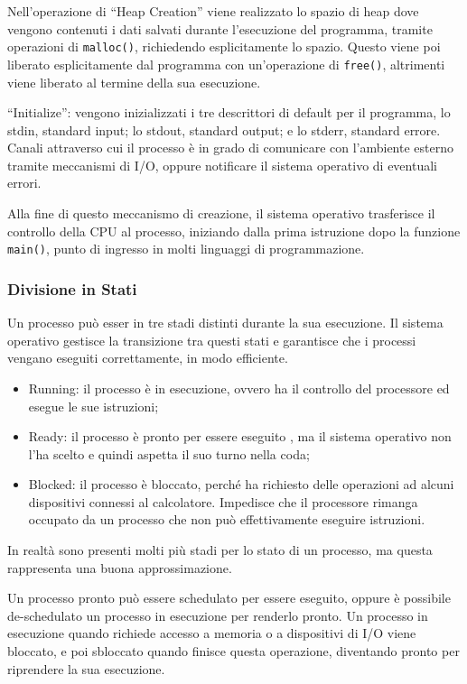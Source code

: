 \documentclass{article}
\numberwithin{equation}{subsection}
\begin{document}
Nell'operazione di ``Heap Creation'' viene realizzato lo spazio di heap dove vengono contenuti i dati salvati durante l'esecuzione del programma, tramite operazioni 
di \verb|malloc()|, richiedendo esplicitamente lo spazio. Questo viene poi liberato esplicitamente dal programma con un'operazione di \verb|free()|, altrimenti viene 
liberato al termine della sua esecuzione. 

``Initialize'': vengono inizializzati i tre descrittori di default per il programma, lo stdin, standard input; lo stdout, standard output; e lo stderr, standard errore. 
Canali attraverso cui il processo è in grado di comunicare con l'ambiente esterno tramite meccanismi di I/O, oppure notificare il sistema operativo di eventuali errori. 

Alla fine di questo meccanismo di creazione, il sistema operativo trasferisce il controllo della CPU al processo, iniziando dalla prima istruzione dopo la funzione 
\verb|main()|, punto di ingresso in molti linguaggi di programmazione. 

\subsubsection{Divisione in Stati}

Un processo può esser in tre stadi distinti durante la sua esecuzione. Il sistema operativo gestisce la transizione tra questi stati e garantisce che i processi 
vengano eseguiti correttamente, in modo efficiente. 
\begin{itemize}
	\item Running: il processo è in esecuzione, ovvero ha il controllo del processore ed esegue le sue istruzioni;
	\item Ready: il processo è pronto per essere eseguito , ma il sistema operativo non l'ha scelto e quindi aspetta il suo turno nella coda;
	\item Blocked: il processo è bloccato, perché ha richiesto delle operazioni ad alcuni dispositivi connessi al calcolatore. Impedisce che il processore rimanga occupato da un processo che non può effettivamente eseguire istruzioni.  	
\end{itemize}

In realtà sono presenti molti più stadi per lo stato di un processo, ma questa rappresenta una buona approssimazione. 

Un processo pronto può essere schedulato per essere eseguito, oppure è possibile de-schedulato un processo in esecuzione per renderlo pronto. Un processo in esecuzione 
quando richiede accesso a memoria o a dispositivi di I/O viene bloccato, e poi sbloccato quando finisce questa operazione, diventando pronto per riprendere la sua 
esecuzione. 
\end{document}
